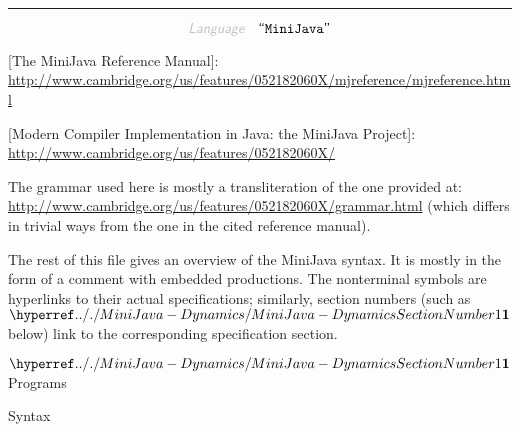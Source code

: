 

\begin{center}
\rule{3in}{0.4pt}
\end{center}

\begin{displaymath}
\KEY{Language} \quad \STRING{MiniJava}
\end{displaymath}

{[}The MiniJava Reference Manual{]}: 
    \href{http://www.cambridge.org/us/features/052182060X/mjreference/mjreference.html}{http://www.cambridge.org/us/features/052182060X/mjreference/mjreference.html}

{[}Modern Compiler Implementation in Java: the MiniJava Project{]}:
    \href{http://www.cambridge.org/us/features/052182060X/}{http://www.cambridge.org/us/features/052182060X/}

The grammar used here is mostly a transliteration of the one provided at:
  \href{http://www.cambridge.org/us/features/052182060X/grammar.html}{http://www.cambridge.org/us/features/052182060X/grammar.html}
  (which differs in trivial ways from the one in the cited reference manual).

The rest of this file gives an overview of the MiniJava syntax. It is mostly
  in the form of a comment with embedded productions. The nonterminal symbols
  are hyperlinks to their actual specifications; similarly, section numbers
  (such as $\SECTHYPER{../.}{MiniJava-Dynamics}{1}$ below) link to the corresponding specification section.

$\SECTHYPER{../.}{MiniJava-Dynamics}{1}$ Programs

Syntax


